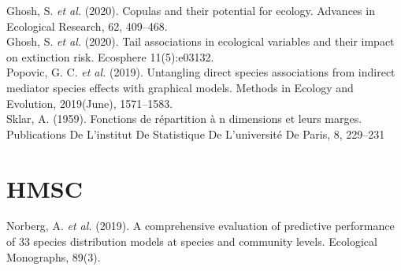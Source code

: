 \documentclass{article}
\begin{document}
Ghosh, S. \textit{et al.} (2020). Copulas and their potential for ecology. Advances in Ecological Research, 62, 409–468. \\

Ghosh, S. \textit{et al.} (2020). Tail associations in ecological variables and their impact on extinction risk. Ecosphere 11(5):e03132. \\

Popovic, G. C. \textit{et al.} (2019). Untangling direct species associations from indirect mediator species effects with graphical models. Methods in Ecology and Evolution, 2019(June), 1571–1583. \\

Sklar, A. (1959). Fonctions de répartition à n dimensions et leurs marges. Publications De L’institut De Statistique De L’université De Paris, 8, 229–231\\ 

\section{HMSC}

Norberg, A. \textit{et al.} (2019). A comprehensive evaluation of predictive performance of 33 species distribution models at species and community levels. Ecological Monographs, 89(3). \\
\end{document}
